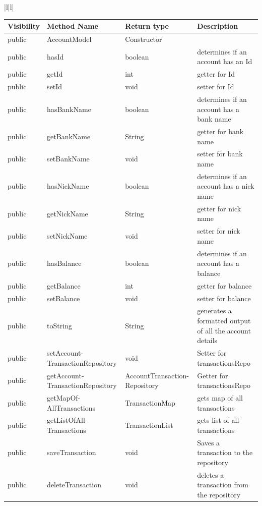 \documentclass[12pt]{article}
\begin{document}
\begin{center}
\begin{tabular}{|l|l|}
\footnotesize
\begin{tabular}{l|p{3.5cm}|p{3.5cm}|p{4.5cm}}
\textbf{Visibility} & \textbf{Method Name} & \textbf{Return type} &\textbf{Description} \\ \hline
public &AccountModel &Constructor\\ \hline 
public &hasId &boolean &determines if an account has an Id\\ \hline 
public &getId &int &getter for Id\\ \hline 
public &setId &void &setter for Id\\ \hline 
public &hasBankName&boolean &determines if an account has a bank name\\ \hline 
public &getBankName&String &getter for bank name\\ \hline 
public &setBankName &void &setter for bank name\\ \hline 
public &hasNickName&boolean &determines if an account has a nick name\\ \hline 
public &getNickName&String &getter for nick name\\ \hline 
public &setNickName &void &setter for nick name\\ \hline 
public &hasBalance&boolean &determines if an account has a balance\\ \hline 
public &getBalance&int &getter for balance\\ \hline 
public &setBalance&void &setter for balance\\ \hline 
public &toString &String &generates a formatted output of all the account details\\ \hline 
public &setAccount-\newline TransactionRepository&void &Setter for transactionsRepo\\ \hline 
public &getAccount-\newline TransactionRepository&AccountTransaction-\newline Repository &Getter for transactionsRepo\\ \hline 
public &getMapOf-\newline AllTransactions &TransactionMap&gets map of all transactions\\ \hline 
public &getListOfAll-\newline Transactions &TransactionList&gets list of all transactions\\ \hline 
public &saveTransaction&void &Saves a transaction to the repository\\ \hline 
public &deleteTransaction&void &deletes a transaction from the repository
\end{tabular} \\ \hline

\end{tabular}
\end{center}
\end{document}
